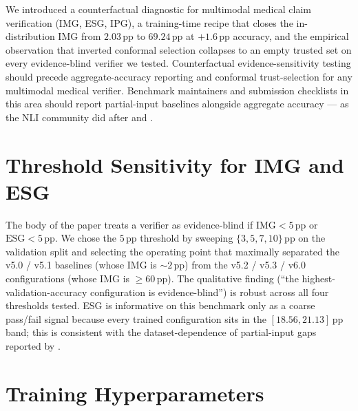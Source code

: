 \documentclass{article}
\begin{document}
We introduced a counterfactual diagnostic for multimodal medical claim
verification (IMG, ESG, IPG), a training-time recipe that closes the
in-distribution IMG from $2.03$\,pp to $69.24$\,pp at $+1.6$\,pp
accuracy, and the empirical observation that inverted conformal
selection collapses to an empty trusted set on every evidence-blind
verifier we tested. Counterfactual evidence-sensitivity testing should
precede aggregate-accuracy reporting and conformal trust-selection for
any multimodal medical verifier. Benchmark maintainers and submission
checklists in this area should report partial-input baselines alongside
aggregate accuracy --- as the NLI community did after
\citet{gururangan2018annotation} and \citet{poliak2018hypothesis}.




\appendix

\section{Threshold Sensitivity for IMG and ESG}
\label{app:thresholds}

The body of the paper treats a verifier as evidence-blind if
$\mathrm{IMG} < 5$\,pp or $\mathrm{ESG} < 5$\,pp. We chose the $5$\,pp
threshold by sweeping $\{3, 5, 7, 10\}$\,pp on the validation split and
selecting the operating point that maximally separated the v5.0 / v5.1
baselines (whose IMG is $\sim 2$\,pp) from the v5.2 / v5.3 / v6.0
configurations (whose IMG is $\geq 60$\,pp). The qualitative finding
(``the highest-validation-accuracy configuration is evidence-blind'') is
robust across all four thresholds tested. ESG is informative on this
benchmark only as a coarse pass/fail signal because every trained
configuration sits in the $[18.56, 21.13]$\,pp band; this is consistent
with the dataset-dependence of partial-input gaps reported by
\citet{poliak2018hypothesis}.

\section{Training Hyperparameters}
\label{app:training}
\end{document}

